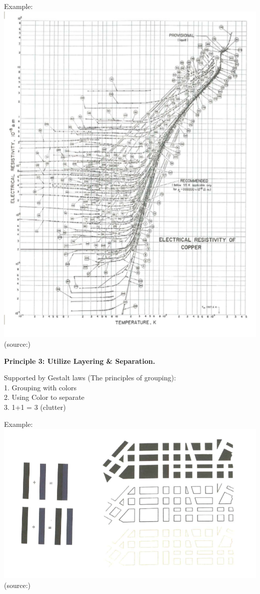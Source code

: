 \documentclass[]{book}
\theoremstyle{definition}
\theoremstyle{definition}
\theoremstyle{definition}
\theoremstyle{remark}
\begin{document}
Example:\\
\includegraphics{images/Tufte_figure9.png} (source:\citep{Tufte_2001})

\textbf{Principle 3: Utilize Layering \& Separation.}

Supported by Gestalt laws (The principles of grouping):\\
1. Grouping with colors\\
2. Using Color to separate\\
3. 1+1 = 3 (clutter)

Example:\\
\includegraphics{images/Tufte_figure10.png} (source:\citep{Tufte_2001})
\end{document}

